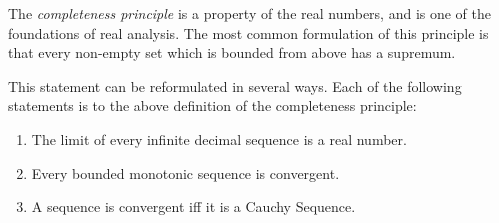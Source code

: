 \documentclass[12pt]{article}
\begin{document}
The \emph{completeness principle} is a property of the real numbers, and is one of the foundations of real analysis. The most common formulation of this principle is that every non-empty set which is bounded from above has a supremum.

This statement can be reformulated in several ways.  Each of the following statements is  to the above definition of the completeness principle:
\begin{enumerate}
\item The limit of every infinite decimal sequence is a real number.
\item Every bounded monotonic sequence is convergent.
\item A sequence is convergent iff it is a Cauchy Sequence.
\end{enumerate}
\end{document}
